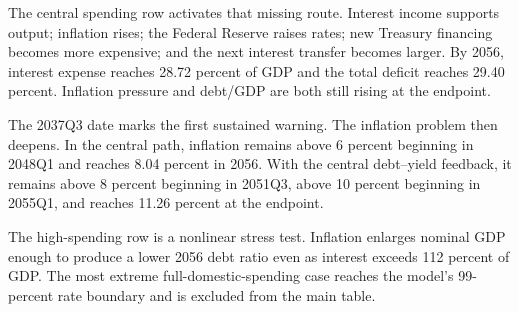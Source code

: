 \documentclass[11pt]{article}
\begin{document}
The central spending row activates that missing route.  Interest income supports output;
inflation rises; the Federal Reserve raises rates; new Treasury financing becomes more
expensive; and the next interest transfer becomes larger.  By 2056, interest expense reaches
28.72 percent of GDP and the total deficit reaches 29.40 percent.  Inflation pressure and
debt/GDP are both still rising at the endpoint.

The 2037Q3 date marks the first sustained warning.  The inflation problem then deepens.  In
the central path, inflation remains above 6 percent beginning in 2048Q1 and reaches 8.04
percent in 2056.  With the central debt--yield feedback, it remains above 8 percent beginning
in 2051Q3, above 10 percent beginning in 2055Q1, and reaches 11.26 percent at the endpoint.

The high-spending row is a nonlinear stress test.  Inflation enlarges nominal GDP enough to
produce a lower 2056 debt ratio even as interest exceeds 112 percent of GDP.  The most extreme
full-domestic-spending case reaches the model's 99-percent rate boundary and is excluded from
the main table.
\end{document}
